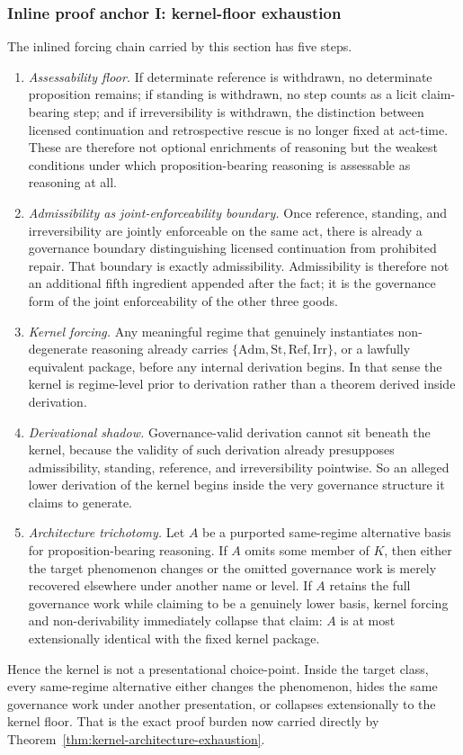 \subsubsection*{Inline proof anchor I: kernel-floor exhaustion}

The inlined forcing chain carried by this section has five steps.
\begin{enumerate}
  \item \emph{Assessability floor.} If determinate reference is withdrawn, no determinate proposition remains; if standing is withdrawn, no step counts as a licit claim-bearing step; and if irreversibility is withdrawn, the distinction between licensed continuation and retrospective rescue is no longer fixed at act-time. These are therefore not optional enrichments of reasoning but the weakest conditions under which proposition-bearing reasoning is assessable as reasoning at all.
  \item \emph{Admissibility as joint-enforceability boundary.} Once reference, standing, and irreversibility are jointly enforceable on the same act, there is already a governance boundary distinguishing licensed continuation from prohibited repair. That boundary is exactly admissibility. Admissibility is therefore not an additional fifth ingredient appended after the fact; it is the governance form of the joint enforceability of the other three goods.
  \item \emph{Kernel forcing.} Any meaningful regime that genuinely instantiates non-degenerate reasoning already carries $\{\mathrm{Adm},\mathrm{St},\mathrm{Ref},\mathrm{Irr}\}$, or a lawfully equivalent package, before any internal derivation begins. In that sense the kernel is regime-level prior to derivation rather than a theorem derived inside derivation.
  \item \emph{Derivational shadow.} Governance-valid derivation cannot sit beneath the kernel, because the validity of such derivation already presupposes admissibility, standing, reference, and irreversibility pointwise. So an alleged lower derivation of the kernel begins inside the very governance structure it claims to generate.
  \item \emph{Architecture trichotomy.} Let $A$ be a purported same-regime alternative basis for proposition-bearing reasoning. If $A$ omits some member of $K$, then either the target phenomenon changes or the omitted governance work is merely recovered elsewhere under another name or level. If $A$ retains the full governance work while claiming to be a genuinely lower basis, kernel forcing and non-derivability immediately collapse that claim: $A$ is at most extensionally identical with the fixed kernel package.
\end{enumerate}
Hence the kernel is not a presentational choice-point. Inside the target class, every same-regime alternative either changes the phenomenon, hides the same governance work under another presentation, or collapses extensionally to the kernel floor. That is the exact proof burden now carried directly by Theorem~\ref{thm:kernel-architecture-exhaustion}.\cite{MaleyFoundationalClosure,MaleyNecessity}

